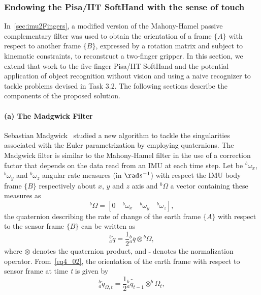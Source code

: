 
\subsubsection{Endowing the Pisa/IIT SoftHand with the sense of touch}
\label{sec:SenseOfTouch}

In~\ref{sec:imu2Fingers}, a modified version of the Mahony-Hamel passive complementary filter was used to obtain the orientation of a frame $\{ A \}$ with respect to another frame $\{ B \}$, expressed by a rotation matrix and subject to kinematic constraints, to reconstruct a two-finger gripper. In this section, we extend that work to the five-finger Pisa/IIT SoftHand and the potential application of object recognition without vision and using a naive recognizer to tackle problems devised in Task 3.2. The following sections describe the components of the proposed solution.

\paragraph{(a) The Madgwick Filter}

Sebastian Madgwick~\cite{MadgwickMARG} studied a new algorithm to tackle the singularities associated with the Euler parametrization by employing quaternions. The Madgwick filter is similar to the Mahony-Hamel filter in the use of a correction factor that depends on the data read from an IMU at each time step. Let be ${^b\omega_x}$, ${^b\omega_y}$ and ${^b\omega_z}$ angular rate measures (in $\rad s^{-1}$) with respect the IMU body frame $\{ B\}$ respectively about $x$, $y$ and $z$ axis and $^{b}\Omega$ a vector containing these measures as
\begin{equation}
\label{eq4_01}
^b \Omega = [ 0 \quad {^b\omega_x} \quad {^b\omega_y} \quad {^b\omega_z} ],
\end{equation}
the quaternion describing the rate of change of the earth frame $\{ A \}$ with respect to the sensor frame $\{ B \}$ can be written as
\begin{equation}
\label{eq4_02}
^b_a\dot{q} = \frac{1}{2} {^b_a \bar{q}}  \otimes {^b\Omega},
\end{equation}
where $\otimes$ denotes the quaternion product, and $\bar{}$ denotes the normalization operator. From~\eqref{eq4_02}, the orientation of the earth frame with respect to sensor frame at time \textit{t} is given by
\begin{equation}
\label{eq4_03}
^b_a \dot{q}_{\Omega,t} = \frac{1}{2} {^b_a \hat{\bar{q}}_{t-1}} \otimes ^b \Omega_t,
\end{equation}


